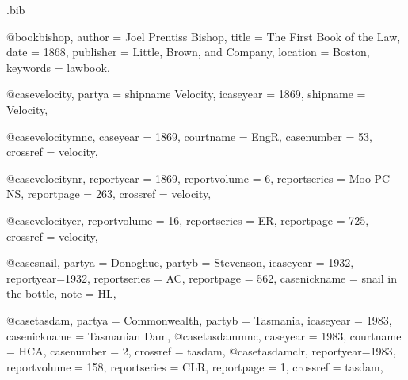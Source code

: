 \begin{filecontents*}[overwrite]{\jobname.bib}

@book{bishop,
author = {Joel Prentiss Bishop},
title = {The First Book of the Law},
date = {1868},
publisher = {Little, Brown, and Company},
location = {Boston},
keywords = {lawbook},
}


@case{velocity,
  partya = {shipname Velocity},
  icaseyear = {1869},
  shipname = {Velocity},
	}

@case{velocitymnc,
  caseyear = {1869},
  courtname = {EngR},
  casenumber = {53},
  crossref = {velocity},
}


@case{velocitynr,
  reportyear = {1869},
  reportvolume = {6},
  reportseries = {Moo PC NS},
  reportpage = {263},
  crossref = {velocity},
}

@case{velocityer,
  reportvolume = {16},
  reportseries = {ER},
  reportpage = {725},
  crossref = {velocity},
}





@case{snail,
  partya = {Donoghue}, 
  partyb = {Stevenson},
  icaseyear = {1932},
  reportyear={1932},
  reportseries = {AC},
  reportpage = {562},
  casenickname = {snail in the bottle},
  note = {HL},
	}


@case{tasdam,
  partya = {Commonwealth}, 
  partyb = {Tasmania},
  icaseyear = {1983},
  casenickname = {Tasmanian Dam},
  }
@case{tasdammnc,
  caseyear = {1983},
  courtname = {HCA},
  casenumber = {2},
  crossref = {tasdam},
  }
@case{tasdamclr,
  reportyear={1983},
  reportvolume = {158},
  reportseries = {CLR},
  reportpage = {1},
  crossref = {tasdam},
  	}


\end{filecontents*}
